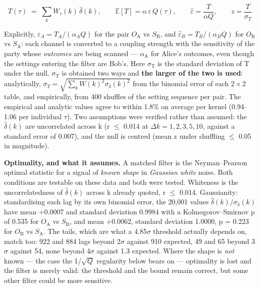 \documentclass[
  11pt,
]{article}
\newcounter{none} %
\begin{document}
\begin{equation}
T(\tau) \;=\; \sum_k W_\tau(k)\,\hat\delta(k), \qquad \mathbb{E}[T] = \alpha\,\varepsilon\,Q(\tau), \qquad \hat\varepsilon = \frac{T}{\alpha Q}, \qquad z = \frac{T}{\sigma_T}
\label{eq:T}
\end{equation}

Explicitly, \(\hat\varepsilon_A = T_A/(\alpha_A Q)\) for the pair
\(O_{\mathrm{A}}\) vs \(S_{\mathrm{B}}\), and
\(\hat\varepsilon_B = T_B/(\alpha_B Q)\) for \(O_{\mathrm{B}}\) vs
\(S_{\mathrm{A}}\): each channel is converted to a coupling strength
with the sensitivity of the party whose \emph{outcomes} are being
scanned --- \(\alpha_{\mathrm{A}}\) for Alice's outcomes, even though
the settings entering the filter are Bob's. Here \(\sigma_{\mathrm{T}}\)
is the standard deviation of T under the null. \(\sigma_{\mathrm{T}}\)
is obtained two ways and \textbf{the larger of the two is used}:
analytically,
\(\sigma_T = \sqrt{\textstyle\sum_k W(k)^2\sigma_\delta(k)^2}\) from the
binomial error of each \(2\times2\) table, and empirically, from 400
shuffles of the setting sequence per pair. The empirical and analytic
values agree to within 1.8\% on average per kernel (0.94--1.06 per
individual \(\tau\)). Two assumptions were verified rather than assumed:
the \(\hat\delta(k)\) are uncorrelated across k (\textbar r\textbar{}
\(\le\) 0.014 at \(\Delta k = 1, 2, 3, 5, 10\), against a standard error
of 0.007), and the null is centred (mean z under shuffling \(\le\) 0.05
in magnitude).

\textbf{Optimality, and what it assumes.} A matched filter is the
Neyman--Pearson optimal statistic for a signal of \emph{known shape} in
\emph{Gaussian white} noise. Both conditions are testable on these data
and both were tested. Whiteness is the uncorrelatedness of
\(\hat\delta(k)\) across k already quoted, \textbar r\textbar{} \(\le\)
0.014. Gaussianity: standardising each lag by its own binomial error,
the 20,001 values \(\hat\delta(k)/\sigma_\delta(k)\) have mean +0.0007
and standard deviation 0.9984 with a Kolmogorov--Smirnov p of 0.535 for
\(O_{\mathrm{A}}\) vs \(S_{\mathrm{B}}\), and mean +0.0062, standard
deviation 1.0000, p = 0.223 for \(O_{\mathrm{B}}\) vs
\(S_{\mathrm{A}}\). The tails, which are what a 4.85\(\sigma\) threshold
actually depends on, match too: 922 and 884 lags beyond 2\(\sigma\)
against 910 expected, 49 and 65 beyond 3\(\sigma\) against 54, none
beyond 4\(\sigma\) against 1.3 expected. Where the shape is \emph{not}
known --- the case the 1/\(\sqrt{Q}\) regularity below bears on ---
optimality is lost and the filter is merely valid: the threshold and the
bound remain correct, but some other filter could be more sensitive.
\end{document}
